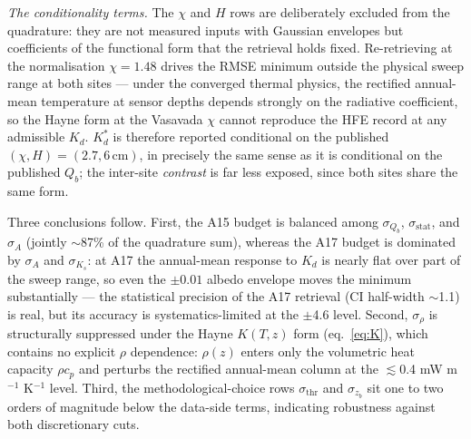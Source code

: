\documentclass[11pt]{article}
\begin{document}
\emph{The conditionality terms.} The $\chi$ and $H$ rows are deliberately
excluded from the quadrature: they are not measured inputs with Gaussian
envelopes but coefficients of the \citet{hayne2017} functional form that
the retrieval holds fixed. Re-retrieving at the \citet{vasavada2012}
normalisation $\chi=1.48$ drives the RMSE minimum outside the physical
sweep range at both sites --- under the converged thermal physics, the
rectified annual-mean temperature at sensor depths depends strongly on the
radiative coefficient, so the Hayne form at the Vasavada $\chi$ cannot
reproduce the HFE record at any admissible $K_d$. $K_d^{*}$ is therefore
reported conditional on the published $(\chi, H)=(2.7, 6\,\mathrm{cm})$,
in precisely the same sense as it is conditional on the published $Q_b$;
the inter-site \emph{contrast} is far less exposed, since both sites share
the same form.

Three conclusions follow. First, the A15 budget is balanced among
$\sigma_{Q_b}$, $\sigma_\mathrm{stat}$, and $\sigma_A$ (jointly
$\sim$87\% of the quadrature sum), whereas the A17 budget is dominated by
$\sigma_A$ and $\sigma_{K_s}$: at A17 the annual-mean response to $K_d$ is
nearly flat over part of the sweep range, so even the $\pm0.01$ albedo
envelope moves the minimum substantially --- the statistical precision of
the A17 retrieval (CI half-width $\sim$1.1) is real, but its accuracy is
systematics-limited at the $\pm$4.6 level. Second, $\sigma_\rho$ is
structurally suppressed under the Hayne $K(T,z)$ form (eq.~\ref{eq:K}),
which contains no explicit $\rho$ dependence: $\rho(z)$ enters only the
volumetric heat capacity $\rho c_p$ and perturbs the rectified annual-mean
column at the $\lesssim$0.4 mW m$^{-1}$ K$^{-1}$ level. Third, the
methodological-choice rows $\sigma_\mathrm{thr}$ and $\sigma_{z_b}$ sit
one to two orders of magnitude below the data-side terms, indicating
robustness against both discretionary cuts.
\end{document}
